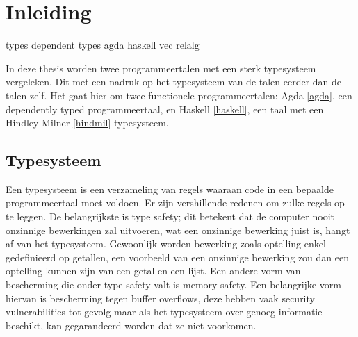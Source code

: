 \chapter{Inleiding}
\label{inleiding}

types
dependent types
agda
haskell
vec relalg

In deze thesis worden twee programmeertalen met een sterk typesysteem
vergeleken. Dit met een nadruk op het typesysteem van de talen eerder dan de
talen zelf. Het gaat hier om twee functionele programmeertalen: Agda
\ref{agda}, een dependently typed programmeertaal, en Haskell \ref{haskell},
een taal met een Hindley-Milner \ref{hindmil} typesysteem.


\section{Typesysteem}

Een typesysteem is een verzameling van regels waaraan code in een bepaalde
programmeertaal moet voldoen. Er zijn vershillende redenen om zulke regels op
te leggen. De belangrijkste is type safety; dit betekent dat de computer nooit
onzinnige bewerkingen zal uitvoeren, wat een onzinnige bewerking juist is,
hangt af van het typesysteem. Gewoonlijk worden bewerking zoals optelling enkel
gedefinieerd op getallen, een voorbeeld van een onzinnige bewerking zou dan een
optelling kunnen zijn van een getal en een lijst. Een andere vorm van
bescherming die onder type safety valt is memory safety. Een belangrijke vorm
hiervan is bescherming tegen buffer overflows, deze hebben vaak security
vulnerabilities tot gevolg maar als het typesysteem over genoeg informatie
beschikt, kan gegarandeerd worden dat ze niet voorkomen.
